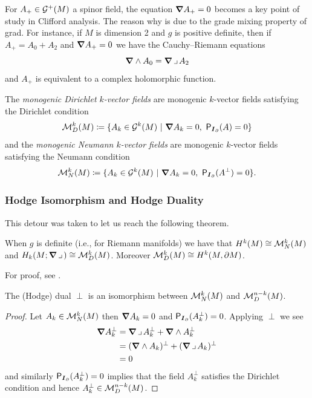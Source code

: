 \documentclass{article}
\begin{document}
\begin{remark}
For $A_+\in \mathcal{G}^+(M)$ a spinor field, the equation $\boldsymbol{\nabla} A_+ = 0$ becomes a key point of study in Clifford analysis. The reason why is due to the grade mixing property of grad. For instance, if $M$ is dimension 2 and $g$ is positive definite, then if $A_+=A_0+A_2$ and $\boldsymbol{\nabla} A_+=0$ we have the Cauchy--Riemann equations
\begin{equation}
    \boldsymbol{\nabla} \wedge A_0 = \boldsymbol{\nabla} \hspace*{.5mm}\lrcorner \hspace*{.5mm} A_2
\end{equation}
and $A_+$ is equivalent to a complex holomorphic function.
\end{remark}

\begin{definition}
The \emph{monogenic Dirichlet $k$-vector fields} are monogenic $k$-vector fields satisfying the Dirichlet condition
\begin{equation}
\mathcal{M}_D^k(M) \coloneqq \{ A_k \in \mathcal{G}^k(M) ~\vert~ \boldsymbol{\nabla} A_k = 0, ~ \mathsf{P}_{\boldsymbol{I}_{\partial}}(A)=0\}
\end{equation}
and the \emph{monogenic Neumann $k$-vector fields} are monogenic $k$-vector fields satisfying the Neumann condition
\begin{equation}
\mathcal{M}_N^k(M) \coloneqq \{ A_k \in \mathcal{G}^k(M) ~\vert~ \boldsymbol{\nabla} A_k = 0, ~\mathsf{P}_{\boldsymbol{I}_\partial}(A^\perp)=0 \}.
\end{equation}
\end{definition}

\subsubsection{Hodge Isomorphism and Hodge Duality}

This detour was taken to let us reach the following theorem.

\begin{theorem}
When $g$ is definite (i.e., for Riemann manifolds) we have that $H^k(M) \cong \mathcal{M}^k_N(M)$ and $H_k(M;\boldsymbol{\nabla} \hspace*{.5mm}\lrcorner \hspace*{.5mm}) \cong \mathcal{M}^k_D(M)$. Moreover $\mathcal{M}^k_D(M) \cong H^k(M,\partial M)$.
\end{theorem}
For proof, see \cite[Theorem 2.6.1 and Corollary 2.6.2]{schwarz_hodge_1995}.

\begin{proposition}
The (Hodge) dual $\perp$ is an isomorphism between $\mathcal{M}^k_N(M)$ and $\mathcal{M}^{n-k}_D(M)$. 
\end{proposition}
\begin{proof}
Let $A_k \in \mathcal{M}^k_N(M)$ then $\boldsymbol{\nabla} A_k = 0$ and $\mathsf{P}_{\boldsymbol{I}_\partial}(A_k^\perp)=0$. Applying $\perp$ we see
\begin{align}
    \boldsymbol{\nabla} A_k^\perp &= \boldsymbol{\nabla} \hspace*{.5mm}\lrcorner \hspace*{.5mm} A_k^\perp + \boldsymbol{\nabla} \wedge A_k^\perp\\
        &= (\boldsymbol{\nabla} \wedge A_k)^\perp + (\boldsymbol{\nabla} \hspace*{.5mm}\lrcorner \hspace*{.5mm} A_k)^\perp\\
        &=0
\end{align}
and similarly $\mathsf{P}_{\boldsymbol{I}_\partial}(A_k^\perp)=0$ implies that the field $A_k^\perp$ satisfies the Dirichlet condition and hence $A_k^\perp \in \mathcal{M}^{n-k}_D(M)$. 
\end{proof}
\end{document}
